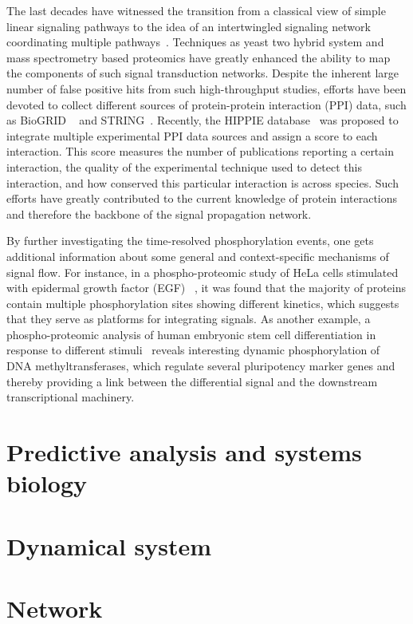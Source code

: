 The last decades have witnessed the transition from a classical view of 
simple linear signaling pathways
to the idea of an intertwingled signaling network coordinating multiple 
pathways~\citep{Kholodenko2012}. Techniques as yeast two hybrid system 
and mass spectrometry based
proteomics have greatly enhanced the ability to map the components of such 
signal transduction networks. Despite the inherent large number of false
positive hits from such high-throughput studies, efforts have been devoted
to collect different sources of protein-protein interaction 
(PPI) data, such as BioGRID%
~\citep{Stark2006} and STRING~\citep{Szklarczyk2011}. Recently, the HIPPIE
database~\citep{Schaefer2012} was proposed to integrate multiple experimental PPI
data sources and assign a score to each interaction. This
score measures the number of publications reporting a certain
interaction, the quality of the experimental technique used
to detect this interaction, and how conserved this particular
interaction is across species. Such efforts have greatly 
contributed to the current knowledge of protein interactions
and therefore the backbone of the signal propagation network.

By further investigating the time-resolved phosphorylation
events, one gets additional information about some general
and context-specific mechanisms of signal flow.
For instance, in a phospho-proteomic study of 
HeLa cells stimulated with epidermal growth factor (EGF)~%
\citep{Olsen2006},
it was found that the majority of proteins contain multiple 
phosphorylation sites showing different kinetics, which 
suggests that they serve as platforms for integrating 
signals. As another example, a phospho-proteomic analysis
of human embryonic stem cell differentiation in response
to different stimuli~\citep{Ribbolt2011} reveals interesting
dynamic phosphorylation of DNA methyltransferases, which
regulate several pluripotency marker genes and thereby 
providing a link between the differential signal and the
downstream transcriptional machinery.

\section{Predictive analysis and systems biology}

\section{Dynamical system}

\section{Network}
